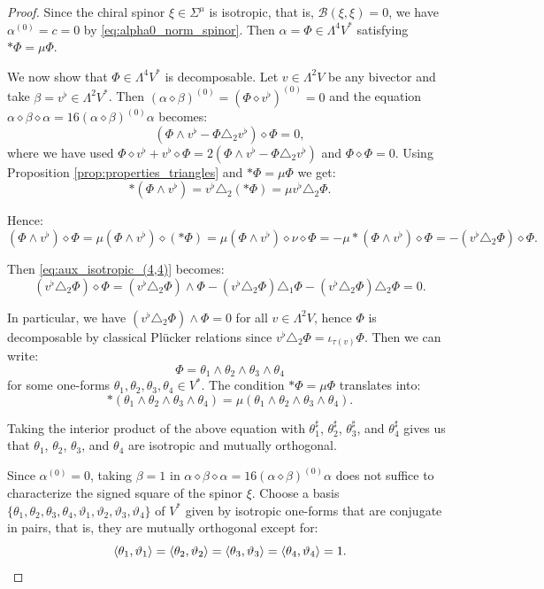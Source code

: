 \documentclass[10pt,reqno]{amsart}
\theoremstyle{definition}
\theoremstyle{remark}
\DeclarePairedDelimiter{\escal}{\langle}{\rangle}
\begin{document}
\begin{proof}
    Since the chiral spinor $\xi\in\Sigma^\mu$ is isotropic, that is, $\mathscr{B}(\xi,\xi)=0$, we have $\alpha^{(0)}=c=0$ by \eqref{eq:alpha0_norm_spinor}. Then $\alpha=\Phi\in\Lambda^4V^*$ satisfying $*\Phi=\mu\Phi$.\medskip
    
    We now show that $\Phi\in\Lambda^4V^*$ is decomposable. Let $v\in\Lambda^2V$ be any bivector and take $\beta=v^\flat\in\Lambda^2V^*$. Then $(\alpha\diamond\beta)^{(0)}=(\Phi\diamond v^\flat)^{(0)}=0$ and the equation $\alpha\diamond\beta\diamond\alpha=16(\alpha\diamond\beta)^{(0)}\alpha$ becomes: \begin{equation}\label{eq:aux_isotropic_(4,4)}
        (\Phi\wedge v^\flat-\Phi\triangle_2 v^\flat)\diamond\Phi=0,
    \end{equation} where we have used $\Phi\diamond v^\flat+v^\flat\diamond\Phi=2(\Phi\wedge v^\flat-\Phi\triangle_2 v^\flat)$ and $\Phi\diamond\Phi=0$. Using Proposition \ref{prop:properties_triangles} and $*\Phi=\mu\Phi$ we get: $$*(\Phi\wedge v^\flat)=v^\flat\triangle_2(*\Phi)=\mu v^\flat\triangle_2\Phi.$$
    
    Hence: $$(\Phi\wedge v^\flat)\diamond\Phi=\mu(\Phi\wedge v^\flat)\diamond(*\Phi)=\mu(\Phi\wedge v^\flat)\diamond\nu\diamond\Phi=-\mu*(\Phi\wedge v^\flat)\diamond\Phi=-(v^\flat\triangle_2\Phi)\diamond\Phi.$$
    
    Then \eqref{eq:aux_isotropic_(4,4)} becomes: $$(v^\flat\triangle_2\Phi)\diamond\Phi=(v^\flat\triangle_2\Phi)\wedge\Phi-(v^\flat\triangle_2\Phi)\triangle_1\Phi-(v^\flat\triangle_2\Phi)\triangle_2\Phi=0.$$
    
    In particular, we have $(v^\flat\triangle_2\Phi)\wedge\Phi=0$ for all $v\in\Lambda^2 V$, hence $\Phi$ is decomposable by classical Plücker relations \cite{Eastwood_Michor2000} since $v^\flat\triangle_2\Phi=\iota_{\tau(v)}\Phi$. Then we can write: $$\Phi=\theta_1\wedge\theta_2\wedge\theta_3\wedge\theta_4$$ for some one-forms $\theta_1,\theta_2,\theta_3,\theta_4\in V^*$. The condition $*\Phi=\mu\Phi$ translates into: $$*(\theta_1\wedge\theta_2\wedge\theta_3\wedge\theta_4)=\mu(\theta_1\wedge\theta_2\wedge\theta_3\wedge\theta_4).$$
    
    Taking the interior product of the above equation with $\theta_1^\sharp$, $\theta_2^\sharp$, $\theta_3^\sharp$, and $\theta_4^\sharp$ gives us that $\theta_1$, $\theta_2$, $\theta_3$, and $\theta_4$ are isotropic and mutually orthogonal.\medskip

    Since $\alpha^{(0)}=0$, taking $\beta=1$ in $\alpha\diamond\beta\diamond\alpha=16(\alpha\diamond\beta)^{(0)}\alpha$ does not suffice to characterize the signed square of the spinor $\xi$. Choose a basis $\{\theta_1,\theta_2,\theta_3,\theta_4,\vartheta_1,\vartheta_2,\vartheta_3,\vartheta_4\}$ of $V^*$ given by isotropic one-forms that are conjugate in pairs, that is, they are mutually orthogonal except for: $$\escal{\theta_1,\vartheta_1}=\escal{\theta_2,\vartheta_2}=\escal{\theta_3,\vartheta_3}=\escal{\theta_4,\vartheta_4}=1.$$
    

\end{proof}
\end{document}
